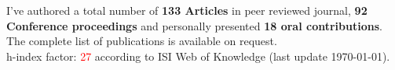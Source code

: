 I've authored a total number of \textbf{133 Articles} in peer reviewed journal,
\textbf{92 Conference proceedings} and personally presented \textbf{18 oral
contributions}. The complete list of publications is available on
request.  \\
h-index factor: \textcolor{red}{27} according to ISI Web of Knowledge
(last update \today). 


\printbibliography[type=article,  title = {Cited publications}, heading=subbibliography, prefixnumbers={A}, resetnumbers=true]

